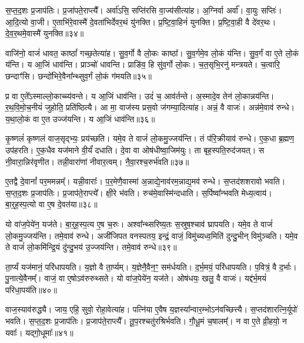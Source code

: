स॒प्त॒द॒शः प्र॒जा\-प॑तिः।
प्र॒जा॑पते॒राप्त्यै᳚।
अर्वा॑ऽसि॒ सप्ति॑रसि वा॒ज्य॑सीत्या॑ह।
अ॒ग्निर्वा अर्वा᳚।
वा॒युः सप्तिः॑।
आ॒दि॒त्यो वा॒जी।
ए॒ताभि॑रे॒वास्मै॑ दे॒वता॑भिर्देवर॒थं यु॑नक्ति।
प्र॒ष्टि॒वा॒हिनं॑ युनक्ति।
प्र॒ष्टि॒वा॒ही वै दे॑वर॒थः।
दे॒व॒र॒थमे॒वास्मै॑ युनक्ति॥३४॥

वाजि॑नो॒ वाजं॑ धावत॒ काष्ठां᳚ गच्छ॒तेत्या॑ह।
सु॒व॒र्गो वै लो॒कः काष्ठा᳚।
सु॒व॒र्गमे॒व लो॒कं य॑न्ति।
सु॒व॒र्गं वा ए॒ते लो॒कं य॑न्ति।
य आ॒जिं धाव॑न्ति।
प्राञ्चो॑ धावन्ति।
प्राङि॑व॒ हि सु॑व॒र्गो लो॒कः।
च॒त॒सृभि॒रनु॑\- मन्त्रयते।
च॒त्वारि॒ छन्दाꣳ॑सि।
छन्दो॑भिरे॒वैना᳚न्थ्सुव॒र्गं लो॒कं ग॑मयति॥३५॥

प्र वा ए॒ते᳚\-ऽस्माल्लो॒काच्च्य॑वन्ते।
य आ॒जिं धाव॑न्ति।
उदं॑ च॒ आव॑र्तन्ते।
अ॒स्मादे॒व तेन॑ लो॒कान्नय॑न्ति।
र॒थ॒वि॒मो॒च॒नीयं॑ जुहोति॒ प्रति॑\-ष्ठित्यै।
आ मा॒ वाज॑स्य प्रस॒वो ज॑गम्या॒दित्या॑ह।
अन्नं॒ वै वाजः॑।
अन्न॑मे॒वाव॑ रुन्धे।
य॒था॒लो॒कं वा ए॒त उज्ज॑यन्ति।
य आ॒जिं धाव॑न्ति॥३६॥

कृ॒ष्णलं॑ कृष्णलं वाज॒सृद्भ्यः॒ प्रय॑च्छति।
यमे॒व ते वाजं॑ लो॒कमु॒ज्जय॑न्ति।
तं प॑रि॒क्रीयाव॑ रुन्धे।
ए॒क॒धा ब्र॒ह्मण॒ उप॑हरति।
ए॒क॒धैव यज॑माने वी॒र्यं॑ दधाति।
दे॒वा वा ओष॑धीष्वा॒जिम॑युः।
ता बृह॒स्पति॒रुद॑जयत्।
स नी॒वारा॒न्निर॑वृणीत।
तन्नी॒वारा॑णां नीवार॒त्वम्।
नै॒वा॒रश्च॒रुर्भ॑वति॥३७॥

ए॒तद्वै दे॒वानां᳚ पर॒ममन्नम्᳚।
यन्नी॒वाराः᳚।
प॒र॒मेणै॒वास्मा॑ अ॒न्नाद्ये॒नाव॑रम॒न्नाद्य॒मव॑ रुन्धे।
स॒प्तद॑शशरावो भवति।
स॒प्त॒द॒शः प्र॒जा\-प॑तिः।
प्र॒जा\-प॑ते॒राप्त्ये᳚।
क्षी॒रे भ॑वति।
रुच॑मे॒वास्मि॑न्दधाति।
स॒र्पिष्वा᳚न्भवति मेध्य॒त्वाय॑।
बा॒र्॒ह॒स्प॒त्यो वा ए॒ष दे॒वत॑या॥३८॥

यो वा॑ज॒पेये॑न॒ यज॑ते।
बा॒र्॒ह॒स्प॒त्य ए॒ष च॒रुः।
अश्वा᳚न्थ्सरिष्य॒तः स॒स्रुष॒श्चाव॑ घ्रापयति।
यमे॒व ते वाजं॑ लो॒कमु॒ज्जय॑न्ति।
तमे॒वाव॑ रुन्धे।
अजी॑जिपत वनस्पतय॒ इन्द्रं॒ वाजं॒ विमु॑च्यध्व॒मिति॑ दुन्दु॒भीन् विमु॑ञ्चति।
यमे॒व ते वाजं॑ लो॒कमि॑न्द्रि॒यं दु॑न्दु॒भय॑ उ॒ज्जय॑न्ति।
तमे॒वाव॑ रुन्धे॥३९॥

ता॒र्प्यं यज॑मानं॒ परि॑धापयति।
य॒ज्ञो वै ता॒र्प्यम्।
य॒ज्ञेनै॒वैन॒ꣳ॒ सम॑र्धयति।
द॒र्भ॒मयं॒ परि॑धापयति।
प॒वित्रं॒ वै द॒र्भाः।
पु॒नात्ये॒वैनम्᳚।
वाजं॒ वा ए॒षो\-ऽव॑रुरुथ्सते।
यो वा॑ज॒पेये॑न॒ यज॑ते।
ओष॑धयः॒ खलु॒ वै वाजः॑।
यद्द॑र्भ॒मयं॑ परिधा॒पय॑ति॥४०॥

वाज॒स्याव॑रुद्ध्यै।
जाय॒ एहि॒ सुवो॒ रोहा॒वेत्या॑ह।
पत्नि॑या ए॒वैष य॒ज्ञस्या᳚न्वार॒म्भो\-ऽन॑वच्छित्त्यै।
स॒प्तद॑शारत्नि॒र्यूपो॑ भवति।
स॒प्त॒द॒शः प्र॒जा\-प॑तिः।
प्र॒जा\-प॑ते॒राप्त्यै᳚।
तू॒प॒रश्चतु॑रश्रिर्भवति।
गौ॒धू॒मं च॒षालम्᳚।
न वा ए॒ते व्री॒हयो॒ न यवाः᳚।
यद्गो॒धूमाः᳚॥४१॥

